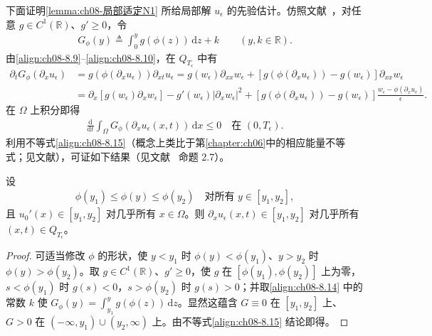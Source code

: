 \documentclass[../../main.tex]{subfiles}%
\begin{document}
下面证明\cref{lemma:ch08-局部适定N1} 所给局部解 $u_\epsilon$ 的先验估计。仿照文献~\cite{ref74}，对任意 $g\in C^1(\mathbb{R})$、$g'\geqslant0$，令
\begin{align}
G_\phi(y)\triangleq \int_0^y g(\phi(z))\,\mathrm{d}z+k\qquad(y,k\in\mathbb{R}). \label{align:ch08-8.14}
\end{align}
由\eqref{align:ch08-8.9}--\eqref{align:ch08-8.10}，在 $Q_{T_\epsilon}$ 中有
\begin{align*}
\partial_t G_\phi(\partial_x u_\epsilon)
&=g(\phi(\partial_x u_\epsilon))\partial_{xt}u_\epsilon
=g(w_\epsilon)\partial_{xx}w_\epsilon+[g(\phi(\partial_x u_\epsilon))-g(w_\epsilon)]\partial_{xx}w_\epsilon\\
&=\partial_x[g(w_\epsilon)\partial_x w_\epsilon]-g'(w_\epsilon)|\partial_x w_\epsilon|^2
+[g(\phi(\partial_x u_\epsilon))-g(w_\epsilon)]\frac{w_\epsilon-\phi(\partial_x u_\epsilon)}{\epsilon}.
\end{align*}
在 $\Omega$ 上积分即得
\begin{align}
\frac{\mathrm{d}}{\mathrm{d}t}\int_\Omega G_\phi(\partial_x u_\epsilon(x,t))\,\mathrm{d}x\leqslant0\quad\text{在 }(0,T_\epsilon). \label{align:ch08-8.15}
\end{align}
利用不等式\eqref{align:ch08-8.15}（概念上类比于第\cref{chapter:ch06}中的相应能量不等式；见文献\cite{ref74}），可证如下结果（见文献~\cite{ref74} 命题 2.7）。

\begin{proposition}[不变区间]\label{proposition:ch08-不变区间}
设
\begin{align}
\phi(y_1)\leqslant\phi(y)\leqslant\phi(y_2)\quad\text{对所有 }y\in[y_1,y_2], \label{align:ch08-8.16}
\end{align}
且 $u_0'(x)\in[y_1,y_2]$ 对几乎所有 $x\in\Omega$。则 $\partial_x u_\epsilon(x,t)\in[y_1,y_2]$ 对几乎所有 $(x,t)\in Q_{T_\epsilon}$。
\end{proposition}

\begin{proof}
可适当修改 $\phi$ 的形状，使 $y<y_1$ 时 $\phi(y)<\phi(y_1)$、$y>y_2$ 时 $\phi(y)>\phi(y_2)$。取 $g\in C^1(\mathbb{R})$、$g'\geqslant0$，使 $g$ 在 $[\phi(y_1),\phi(y_2)]$ 上为零，$s<\phi(y_1)$ 时 $g(s)<0$，$s>\phi(y_2)$ 时 $g(s)>0$；并取\eqref{align:ch08-8.14} 中的常数 $k$ 使 $G_\phi(y)=\int_{y_1}^y g(\phi(z))\,\mathrm{d}z$。显然这蕴含 $G\equiv0$ 在 $[y_1,y_2]$ 上、$G>0$ 在 $(-\infty,y_1)\cup(y_2,\infty)$ 上。由不等式\eqref{align:ch08-8.15} 结论即得。
\end{proof}
\end{document}
